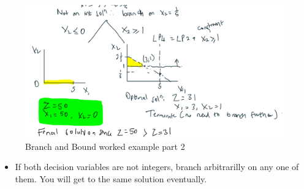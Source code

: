 \documentclass[12pt, a4paper]{article}
\begin{document}
\begin{figure}[ht]
    \centering
    \includegraphics*[width=1.2\textwidth]{Branch_and_Bound_workedexample_part2}
    \caption{Branch and Bound worked example part 2}
    \label{fig: Branch and Bound worked example part 2}
\end{figure}
\begin{itemize}
    \item If both decision variables are not integers, branch arbitrarilly on any one of them. You will get to the same solution eventually.
\end{itemize}
\pagebreak
\end{document}

